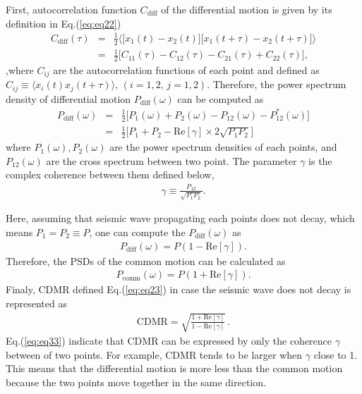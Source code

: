 First, autocorrelation function $C_{\mathrm{diff}}$ of the differential motion is given by its definition in Eq.(\ref{eq:eq22})
\begin{eqnarray}
  C_{\mathrm{diff}}(\tau) &=& \frac{1}{2}
  \biggl\langle
  \biggl[ x_{1}(t)-x_{2}(t) \biggr] \biggl[ x_{1}(t+\tau)-x_{2}(t+\tau) \biggr]
  \biggr\rangle \\
  &=& \frac{1}{2}\biggl[ C_{11}(\tau) - C_{12}(\tau) - C_{21}(\tau) + C_{22}(\tau) \biggr], 
\end{eqnarray}
,where $C_{ij}$ are the autocorrelation functions of each point and defined as $ C_{ij} \equiv \langle x_{i}(t)x_{j}(t+\tau)\rangle,\, (i=1,2,\,j=1,2)$. Therefore, the power spectrum density of differential motion $P_{\mathrm{diff}}(\omega)$ can be computed as
\begin{eqnarray}
  P_{\mathrm{diff}}(\omega) &=& \frac{1}{2}\biggl[ P_{1}(\omega) + P_{2}(\omega) - P_{12}(\omega) - P_{12}^*(\omega) \biggr]\\
  &=& \frac{1}{2} \biggl[ P_{1}+P_{2} - \mathrm{Re}\left[\gamma \right]\times2\sqrt{P_{1}P_{2}} \biggr] \label{eq:eq31}
\end{eqnarray}
where $P_{1}(\omega),P_{2}(\omega)$ are the power spectrum densities of each points, and $P_{12}(\omega)$ are the cross spectrum between two point. The parameter $\gamma$ is the complex coherence between them defined below,
\begin{eqnarray}
  \gamma \equiv \frac{P_{12}}{\sqrt{P_{1}P_{2}}}.
\end{eqnarray}

Here, assuming that seismic wave propagating each points does not decay, which means $P_{1}=P_{2} \equiv P$, one can compute the $P_{\mathrm{diff}}(\omega)$ as 
\begin{eqnarray}
  P_{\mathrm{diff}}(\omega) = P (1-\mathrm{Re}\left[\gamma\right]).
\end{eqnarray}
Therefore, the PSDs of the common motion can be calculated as
\begin{eqnarray}
  P_{\mathrm{comm}}(\omega) = P (1+\mathrm{Re}\left[\gamma\right]).
\end{eqnarray}
Finaly, CDMR defined Eq.(\ref{eq:eq23}) in case the seismic wave does not decay is represented as
\begin{eqnarray}
 \mathrm{CDMR} = \sqrt{\frac{1 + \mathrm{Re} \left[\gamma \right] }{1 - \mathrm{Re} \left[\gamma \right]}}\,. \label{eq:eq33}
\end{eqnarray}
Eq.(\ref{eq:eq33}) indicate that CDMR can be expressed by only the coherence $\gamma$ between of two points. For example, CDMR tends to be larger when $\gamma$ close to 1. This means that the differential motion is more less than the common motion because the two points move together in the same direction.

